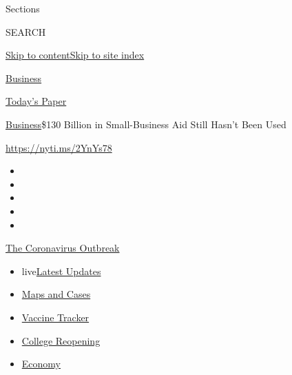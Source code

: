 Sections

SEARCH

\protect\hyperlink{site-content}{Skip to
content}\protect\hyperlink{site-index}{Skip to site index}

\href{https://www.nytimes.com/section/business}{Business}

\href{https://myaccount.nytimes.com/auth/login?response_type=cookie\&client_id=vi}{}

\href{https://www.nytimes.com/section/todayspaper}{Today's Paper}

\href{/section/business}{Business}\textbar{}\$130 Billion in
Small-Business Aid Still Hasn't Been Used

\url{https://nyti.ms/2YnYs78}

\begin{itemize}
\item
\item
\item
\item
\item
\end{itemize}

\href{https://www.nytimes.com/news-event/coronavirus?action=click\&pgtype=Article\&state=default\&region=TOP_BANNER\&context=storylines_menu}{The
Coronavirus Outbreak}

\begin{itemize}
\tightlist
\item
  live\href{https://www.nytimes.com/2020/08/04/world/coronavirus-covid-19.html?action=click\&pgtype=Article\&state=default\&region=TOP_BANNER\&context=storylines_menu}{Latest
  Updates}
\item
  \href{https://www.nytimes.com/interactive/2020/us/coronavirus-us-cases.html?action=click\&pgtype=Article\&state=default\&region=TOP_BANNER\&context=storylines_menu}{Maps
  and Cases}
\item
  \href{https://www.nytimes.com/interactive/2020/science/coronavirus-vaccine-tracker.html?action=click\&pgtype=Article\&state=default\&region=TOP_BANNER\&context=storylines_menu}{Vaccine
  Tracker}
\item
  \href{https://www.nytimes.com/2020/08/02/us/covid-college-reopening.html?action=click\&pgtype=Article\&state=default\&region=TOP_BANNER\&context=storylines_menu}{College
  Reopening}
\item
  \href{https://www.nytimes.com/live/2020/08/04/business/stock-market-today-coronavirus?action=click\&pgtype=Article\&state=default\&region=TOP_BANNER\&context=storylines_menu}{Economy}
\end{itemize}

